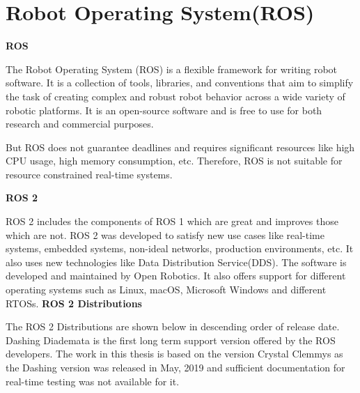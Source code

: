 \documentclass[%
xelatex,
	oneside,		%
	12pt,			%
	parskip=half,	%
	abstracton,
	chapterprefix=true%
    appendixprefix=true]
{scrbook}
\begin{document}
	 \section{Robot Operating System(ROS)}
	 {\bfseries ROS}
	 
The Robot Operating System (ROS) is a flexible framework for writing robot software. It is a collection of tools, libraries, and conventions that aim to simplify the task of creating complex and robust robot behavior across a wide variety of robotic platforms.\cite{ROS}	
It is an open-source software and is free to use for both research and commercial purposes.
 
But ROS does not guarantee deadlines and requires significant resources like high CPU usage, high memory consumption, etc. Therefore, ROS is not suitable for resource constrained real-time systems.

{\bfseries	 ROS 2}

ROS 2 includes the components of ROS 1 which are great and improves those which are not.	ROS 2 was developed to satisfy new use cases like real-time systems, embedded systems, non-ideal networks, production environments, etc. It also uses new technologies like Data Distribution Service(DDS). The software is developed and maintained by Open Robotics.
It also offers support for different operating systems such as Linux, macOS, Microsoft Windows and different RTOSs. 
	 \clearpage
{\bfseries	 ROS 2 Distributions}
	 

The ROS 2 Distributions are shown below in descending order of release date. Dashing Diademata is the first long term support version offered by the ROS developers. The work in this thesis is based on the version Crystal Clemmys as the Dashing version was released in May, 2019 and sufficient documentation for real-time testing was not available for it. 

 
 
\end{document}
